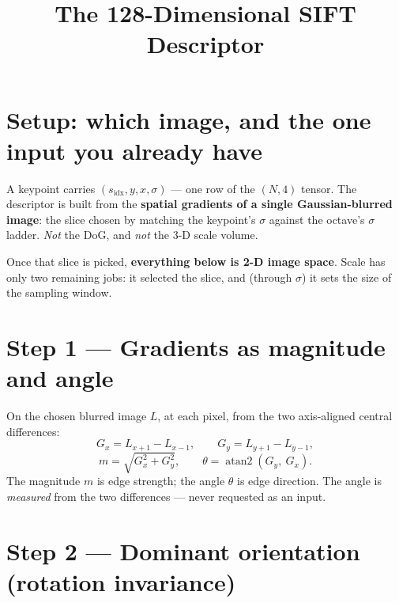 \documentclass[11pt]{article}
\title{The 128-Dimensional SIFT Descriptor}
\author{}
\date{}
\begin{document}
\maketitle

\section{Setup: which image, and the one input you already have}

A keypoint carries $(s_{\text{idx}}, y, x, \sigma)$ --- one row of the $(N,4)$ tensor. The
descriptor is built from the \textbf{spatial gradients of a single Gaussian-blurred image}:
the slice chosen by matching the keypoint's $\sigma$ against the octave's $\sigma$ ladder.
\emph{Not} the DoG, and \emph{not} the 3-D scale volume.

Once that slice is picked, \textbf{everything below is 2-D image space}. Scale has only two
remaining jobs: it selected the slice, and (through $\sigma$) it sets the size of the
sampling window.

\section{Step 1 --- Gradients as magnitude and angle}

On the chosen blurred image $L$, at each pixel, from the two axis-aligned central
differences:
\[
G_x = L_{x+1} - L_{x-1}, \qquad G_y = L_{y+1} - L_{y-1},
\]
\[
m = \sqrt{G_x^2 + G_y^2}, \qquad \theta = \operatorname{atan2}(G_y,\ G_x).
\]
The magnitude $m$ is edge strength; the angle $\theta$ is edge direction. The angle is
\emph{measured} from the two differences --- never requested as an input.

\section{Step 2 --- Dominant orientation (rotation invariance)}
\end{document}
